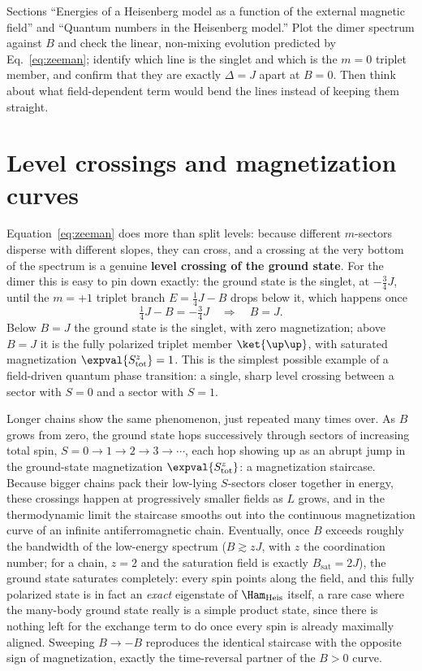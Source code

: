 \documentclass[all_sessions.tex]{subfiles}
\begin{document}
\begin{notebook}
Sections ``Energies of a Heisenberg model as a function of the external magnetic field'' and
``Quantum numbers in the Heisenberg model.'' Plot the dimer spectrum against $B$ and check the
linear, non-mixing evolution predicted by Eq.~\eqref{eq:zeeman}; identify which line is the singlet
and which is the $m=0$ triplet member, and confirm that they are exactly $\Delta=J$ apart at $B=0$.
Then think about what field-dependent term would bend the lines instead of keeping them straight.
\end{notebook}

\section{Level crossings and magnetization curves}
\label{sec:levelcrossings}
Equation~\eqref{eq:zeeman} does more than split levels: because different $m$-sectors disperse with
different slopes, they can cross, and a crossing at the very bottom of the spectrum is a genuine
\textbf{level crossing of the ground state}. For the dimer this is easy to pin down exactly: the
ground state is the singlet, at $-\tfrac34J$, until the $m=+1$ triplet branch $E=\tfrac14J-B$ drops below
it, which happens once
\begin{equation}
  \tfrac14J - B = -\tfrac34J \quad\Longrightarrow\quad B = J.
  \label{eq:crossingfield}
\end{equation}
Below $B=J$ the ground state is the singlet, with zero magnetization; above $B=J$ it is the fully
polarized triplet member $\ket{\up\up}$, with saturated magnetization $\expval{S_{\mathrm{tot}}^z}=1$.
This is the simplest possible example of a field-driven quantum phase transition: a single, sharp level
crossing between a sector with $S=0$ and a sector with $S=1$.

Longer chains show the same phenomenon, just repeated many times over. As $B$ grows from zero, the
ground state hops successively through sectors of increasing total spin, $S=0\to1\to2\to3\to\cdots$,
each hop showing up as an abrupt jump in the ground-state magnetization $\expval{S_{\mathrm{tot}}^z}$: a
magnetization staircase. Because bigger chains pack their low-lying $S$-sectors closer together in
energy, these crossings happen at progressively smaller fields as $L$ grows, and in the thermodynamic
limit the staircase smooths out into the continuous magnetization curve of an infinite antiferromagnetic
chain. Eventually, once $B$ exceeds roughly the bandwidth of the low-energy spectrum ($B\gtrsim zJ$, with
$z$ the coordination number; for a chain, $z=2$ and the saturation field is exactly $B_{\mathrm{sat}}=2J$),
the ground state saturates completely: every spin points along the field,
and this fully polarized state is in fact an \emph{exact} eigenstate of $\Ham_{\mathrm{Heis}}$ itself, a
rare case where the many-body ground state really is a simple product state, since there is nothing left
for the exchange term to do once every spin is already maximally aligned. Sweeping $B\to-B$ reproduces
the identical staircase with the opposite sign of magnetization, exactly the time-reversal partner of the
$B>0$ curve.
\end{document}
